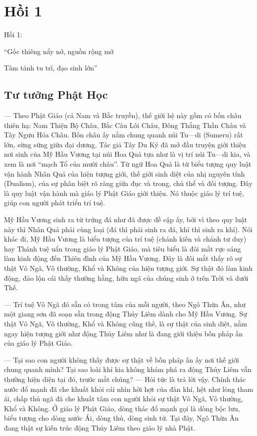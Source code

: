\chapter{Hồi 1} %
\label{cha:hoi_thu_1}

Hồi 1:

\begin{itshape}
``Gốc thiêng nẩy nở, nguồn rộng mở

Tâm tánh tu trì, đạo sinh lớn''
\end{itshape}

\section{Tư tưởng Phật Học} %
\label{sec:hoi_1_tu_tuong_phat_hoc}

— Theo Phật Giáo (cả Nam và Bắc truyền), thế giới hệ này gồm có bốn châu thiên hạ: Nam Thiện Bộ Châu, Bắc Câu Lôi Châu, Đông Thắng Thần Châu và Tây Ngưu Hóa Châu. Bốn châu ấy nằm chung quanh núi Tu—di (Sumeru) rất lớn, sừng sững giữa đại dương. Tác giả Tây Du Ký đã mở đầu truyện giới thiệu nơi sinh của Mỹ Hầu Vương tại núi Hoa Quả tựa như là vị trí núi Tu—di kia, và xem là nơi ``mạch Tổ của mười châu''. Từ ngữ Hoa Quả là từ biểu tượng quy luật vận hành Nhân Quả của hiện tượng giới, thế giới sinh diệt của nhị nguyên tính (Dualism), của sự phân biệt rõ ràng giữa đục và trong, chủ thể và đối tượng. Đây là quy luật vận hành mà giáo lý Phật Giáo giới thiệu. Nó thuộc giáo lý trí tuệ, giúp con người phát triển trí tuệ.

Mỹ Hầu Vương sinh ra từ trứng đá như đã được đề cập ấy, bởi vì theo quy luật này thì Nhân Quả phải cùng loại (đá thì phải sinh ra đá, khỉ thì sinh ra khỉ). Nói khác đi, Mỹ Hầu Vương là biểu tượng của trí tuệ (chánh kiến và chánh tư duy) hay Thánh tuệ uẩn trong giáo lý Phật Giáo, mà tiêu biểu là đôi mắt rực sáng làm kinh động đến Thiên đình của Mỹ Hầu Vương. Đây là đôi mắt thấy rõ sự thật Vô Ngã, Vô thường, Khổ và Không của hiện tượng giới. Sự thật đó làm kinh động, đảo lộn cái thấy thường hằng, hữu ngã của chúng sinh ở trên Trời và dưới Thế.

— Trí tuệ Vô Ngã đó sẵn có trong tâm của mỗi người, theo Ngô Thừa Ân, như một giang sơn đã soạn sẵn trong động Thủy Liêm dành cho Mỹ Hầu Vương. Sự thật Vô Ngã, Vô thường, Khổ và Không cũng thế, là sự thật của sinh diệt, nằm ngay hiện tượng giới như động Thủy Liêm như là đang giới thiệu bốn pháp ấn của giáo lý Phật Giáo.

— Tại sao con người không thấy được sự thật về bốn pháp ấn ấy nơi thế giới chung quanh mình? Tại sao loài khỉ kia không khám phá ra động Thủy Liêm vẫn thường hiện diện tại đó, trước mắt chúng? — Hỏi tức là trả lời vậy. Chính thác nước đổ mạnh đã che khuất khỏi cái nhìn hời hợt của đàn khỉ, hệt như lòng tham ái, chấp thủ ngã đã che khuất tâm con người khỏi sự thật Vô Ngã, Vô thường, Khổ và Không. Ở giáo lý Phật Giáo, dòng thác đổ mạnh gọi là dòng bộc lưu, biểu tượng cho dòng nước Ái, dòng thủ, dòng sinh tử. Tại đây, Ngô Thừa Ân đang thật sự kiến trúc động Thủy Liêm theo giáo lý nhà Phật.

